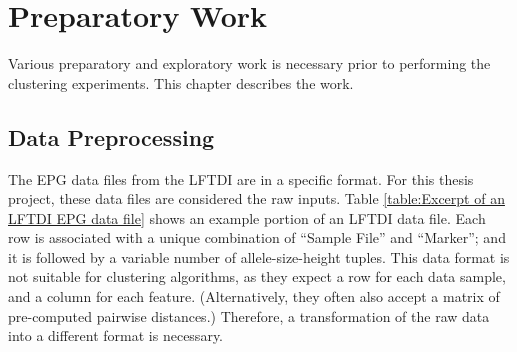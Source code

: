 
\chapter{Preparatory Work}
\label{ch:Preparatory Work}
\thispagestyle{myheadings}

Various preparatory and exploratory work is necessary prior to performing the clustering experiments. This chapter describes the work.

\section{Data Preprocessing}
\label{section:Data Preprocessing}

The EPG data files from the LFTDI are in a specific format. For this thesis project, these data files are considered the raw inputs. Table \ref{table:Excerpt of an LFTDI EPG data file} shows an example portion of an LFTDI data file. Each row is associated with a unique combination of ``Sample File'' and ``Marker''; and it is followed by a variable number of allele-size-height tuples. This data format is not suitable for clustering algorithms, as they expect a row for each data sample, and a column for each feature. (Alternatively, they often also accept a matrix of pre-computed pairwise distances.) Therefore, a transformation of the raw data into a different format is necessary.

